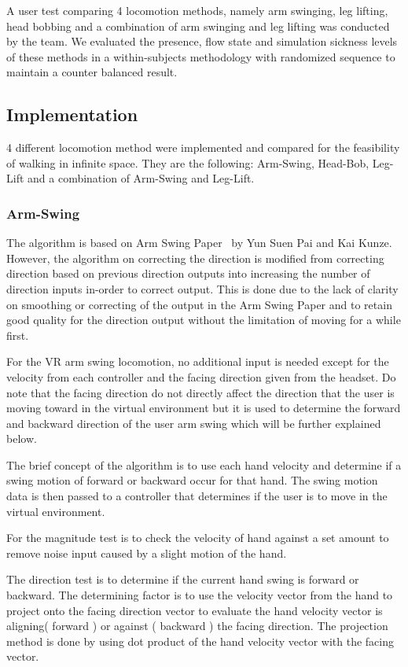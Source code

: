 \documentclass[manuscript,review,anonymous]{acmart}
\begin{document}
A user test comparing 4 locomotion methods, namely arm swinging, leg lifting, head bobbing and a combination of arm swinging and leg lifting was conducted by the team. We evaluated the presence, flow state and simulation sickness levels of these methods in a within-subjects methodology with randomized sequence to maintain a counter balanced result.

\subsection{Implementation}
4 different locomotion method were implemented and compared for the feasibility of walking in infinite space. They are the following:
Arm-Swing, Head-Bob, Leg-Lift and a combination of Arm-Swing and Leg-Lift.

\subsubsection{Arm-Swing}
The algorithm is based on Arm Swing Paper~\cite{armSwing2017} by Yun Suen Pai and Kai Kunze. However, the algorithm on correcting the direction is modified from correcting direction based on previous direction outputs into increasing the number of direction inputs in-order to correct output. This is done due to the lack of clarity on smoothing or correcting of the output in the Arm Swing Paper and to retain good quality for the direction output without the limitation of moving for a while first.

For the VR arm swing locomotion, no additional input is needed except for the velocity from each controller and the facing direction given from the headset. Do note that the facing direction do not directly affect the direction that the user is moving toward in the virtual environment but it is used to determine the forward and backward direction of the user arm swing which will be further explained below.

The brief concept of the algorithm is to use each hand velocity and determine if a swing motion of forward or backward occur for that hand. The swing motion data is then passed to a controller that determines if the user is to move in the virtual environment.

For the magnitude test is to check the velocity of hand against a set amount to remove noise input caused by a slight motion of the hand.

The direction test is to determine if the current hand swing is forward or backward. The determining factor is to use the velocity vector from the hand to project onto the facing direction vector to evaluate the hand velocity vector is aligning( forward ) or against ( backward ) the facing direction. The projection method is done by using dot product of the hand velocity vector with the facing vector.
\end{document}
